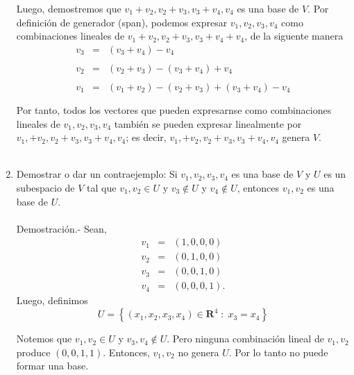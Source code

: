 \begin{enumerate}[\bfseries 1.]
	Luego, demostremos que $v_1+v_2,v_2+v_3,v_3+v_4,v_4$ es una base de $V$. Por definición de generador (span), podemos expresar $v_1,v_2,v_3,v_4$ como combinaciones lineales de $v_1+v_2,v_2+v_3,v_3+v_4+v_4$, de la siguente manera 
	$$
	\begin{array}{rcl}
	    v_3 &=& (v_3+v_4)-v_4\\\\
	    v_2 &=& (v_2+v_3)-(v_3+v_4)+v_4\\\\
	    v_1 &=& (v_1+v_2)-(v_2+v_3)+(v_3+v_4)-v_4\\\\
	\end{array}
	$$
	Por tanto, todos los vectores que pueden expresarnse como combinaciones lineales de $v_1,v_2,v_3,v_4$ también se pueden expresar linealmente por $v_1,+v_2,v_2+v_3,v_3+v_4,v_4$; es decir, $v_1,+v_2,v_2+v_3,v_3+v_4,v_4$ genera $V$.\\\\

    \item Demostrar o dar un contraejemplo: Si $v_1,v_2,v_3,v_4$ es una base de $V$ y $U$ es un subespacio de $V$ tal que $v_1,v_2\in U$ y $v_3\notin U$ y $v_4\notin U$, entonces $v_1,v_2$ es una base de $U$.\\\\
	Demostración.-\; Sean,
	$$
	\begin{array}{rcl}
	    v_1 &=& (1,0,0,0)\\
	    v_2 &=& (0,1,0,0)\\
	    v_3 &=& (0,0,1,0)\\
	    v_4 &=& (0,0,0,1).
	\end{array}
	$$
	Luego, definimos 
	$$U=\left\{(x_1,x_2,x_3,x_4)\in \textbf{R}^4 \; :\; x_3=x_4\right\}$$

	Notemos que $v_1,v_2\in U$ y $v_3,v_4\notin U$. Pero ninguna combinación lineal de $v_1,v_2$ produce $(0,0,1,1)$. Entonces, $v_1,v_2$ no genera $U$. Por lo tanto no puede formar una base.\\\\


\end{enumerate}
